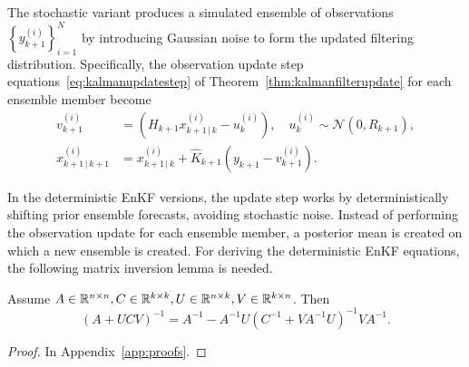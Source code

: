 The stochastic variant produces a simulated ensemble of observations $\left\{ y_{k+1}^{(i)} \right\}_{i=1}^{N}$ by introducing Gaussian noise to form the updated filtering distribution.
Specifically, the observation update step equations~\eqref{eq:kalmanupdatestep} of Theorem~\ref{thm:kalmanfilterupdate} for each ensemble member become
\begin{subequations}\label{eq:enkalmanstochasticupdatestep}
    \begin{align}
        v_{k+1}^{(i)} &= (H_{k+1}x_{k+1 \, \vert \, k}^{(i)} - u_{k}^{(i)}), \quad u_{k}^{(i)} \sim \mathcal{N}(0, R_{k+1}),\\
        x_{k+1\,\vert\,k+1}^{(i)} &= x_{k+1\,\vert\,k}^{(i)} + \hat{K}_{k+1}(y_{k+1} - v_{k+1}^{(i)}).
    \end{align}
\end{subequations}

In the deterministic EnKF versions, the update step works by deterministically shifting prior ensemble forecasts, avoiding stochastic noise.
Instead of performing the observation update for each ensemble member, a posterior mean is created on which a new ensemble is created.
For deriving the deterministic EnKF equations, the following matrix inversion lemma is needed.
\begin{lemma}\label{lemma:woodbury}
    Assume $A \in \mathbb{R}^{n \times n}, C \in \mathbb{R}^{k \times k}, U \in \mathbb{R}^{n \times k}, V \in \mathbb{R}^{k \times n}$.
    Then
    \begin{equation*}
        (A + UCV)^{-1} = A^{-1} - A^{-1}U(C^{-1} + VA^{-1}U)^{-1}VA^{-1}.
    \end{equation*}
\end{lemma}
\begin{proof}
    In Appendix~\ref{app:proofs}.
\end{proof}

